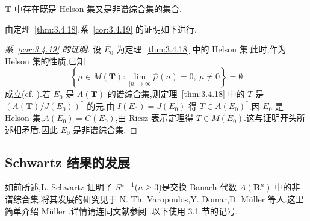 \begin{corollary}\label{cor:3.4.19}
$\mathbf{T}$ 中存在既是 Helson 集又是非谱综合集的集合.
\end{corollary}

由定理~\ref{thm:3.4.18},系~\ref{cor:3.4.19} 的证明如下进行.

\begin{proof}[系~\ref{cor:3.4.19} 的证明]
设 $E_{0}$ 为定理~\ref{thm:3.4.18} 中的 Helson 集.此时,作为 Helson 集的性质,已知
\begin{equation*}
\left\{\mu \in M(\mathbf{T}): \lim_{|n| \to \infty}\widehat{\mu}(n) = 0,\ \mu \neq 0\right\} = \emptyset
\end{equation*}
成立(cf. \cite{ch3:11}).若 $E_{0}$ 是 $A(\mathbf{T})$ 的谱综合集,则定理~\ref{thm:3.4.18} 中的 $T$ 是 $(A(\mathbf{T})/J(E_{0}))^{*}$ 的元,由 $I(E_{0}) = J(E_{0})$ 得 $T \in A(E_{0})^{*}$.因 $E_{0}$ 是 Helson 集,$A(E_{0}) = C(E_{0})$,由 Riesz 表示定理得 $T \in M(E_{0})$.这与证明开头所述相矛盾.因此 $E_{0}$ 是非谱综合集.
\end{proof}

\subsection{Schwartz 结果的发展}\label{sec:3.4.6}

如前所述,L. Schwartz 证明了 $S^{n-1}$($n \geq 3$)是交换 Banach 代数 $A(\mathbf{R}^{n})$ 中的非谱综合集.将其发展的研究见于 N. Th. Varopoulos,Y. Domar,D. Müller 等人.这里简单介绍 Müller \cite{ch3:35}.详情请连同文献参阅 \cite{ch3:35}.以下使用 3.1 节的记号.

